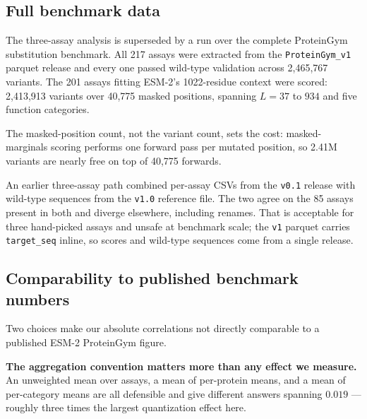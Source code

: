 \documentclass[11pt]{article}
\begin{document}
\subsection{Full benchmark data}

The three-assay analysis is superseded by a run over the complete ProteinGym
substitution benchmark. All 217 assays were extracted from the
\texttt{ProteinGym\_v1} parquet release and every one passed wild-type
validation across 2{,}465{,}767 variants. The 201 assays fitting ESM-2's
1022-residue context were scored: 2{,}413{,}913 variants over 40{,}775 masked
positions, spanning $L = 37$ to $934$ and five function categories.

The masked-position count, not the variant count, sets the cost: masked-marginals
scoring performs one forward pass per mutated position, so 2.41M variants are
nearly free on top of 40{,}775 forwards.

An earlier three-assay path combined per-assay CSVs from the \texttt{v0.1}
release with wild-type sequences from the \texttt{v1.0} reference file. The two
agree on the 85 assays present in both and diverge elsewhere, including renames.
That is acceptable for three hand-picked assays and unsafe at benchmark scale;
the \texttt{v1} parquet carries \texttt{target\_seq} inline, so scores and
wild-type sequences come from a single release.

\subsection{Comparability to published benchmark numbers}
\label{sec:comparability}

Two choices make our absolute correlations not directly comparable to a
published ESM-2 ProteinGym figure.

\textbf{The aggregation convention matters more than any effect we measure.}
An unweighted mean over assays, a mean of per-protein means, and a mean of
per-category means are all defensible and give different answers spanning
$0.019$ --- roughly three times the largest quantization effect here.
\end{document}

